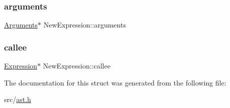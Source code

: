 \subsubsection{\texorpdfstring{arguments}{arguments}}
{\footnotesize\ttfamily \hyperlink{struct_arguments}{Arguments}$\ast$ New\+Expression\+::arguments}

\mbox{\label{struct_new_expression_aa56c9b8daa3725a54fdb2b8fce63d237}} 
\subsubsection{\texorpdfstring{callee}{callee}}
{\footnotesize\ttfamily \hyperlink{struct_expression}{Expression}$\ast$ New\+Expression\+::callee}



The documentation for this struct was generated from the following file\+:\begin{DoxyCompactItemize}
\item 
src/\hyperlink{ast_8h}{ast.\+h}\end{DoxyCompactItemize}
